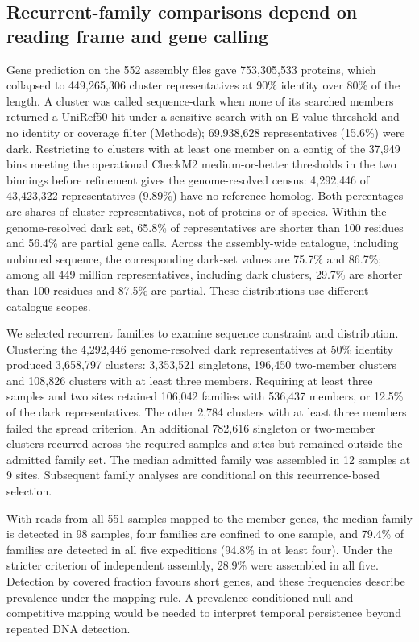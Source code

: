 \documentclass[11pt]{article}
\begin{document}
\subsection*{Recurrent-family comparisons depend on reading frame and gene calling}

Gene prediction on the 552 assembly files gave 753{,}305{,}533 proteins, which collapsed to
449{,}265{,}306 cluster representatives at 90\% identity over 80\% of the length. A cluster was
called sequence-dark when none of its searched members returned a UniRef50 hit under a sensitive
search with an E-value threshold and no identity or coverage filter (Methods); 69{,}938{,}628
representatives (15.6\%) were dark. Restricting to clusters with at least one member on a contig of
the 37{,}949 bins meeting the operational CheckM2 medium-or-better thresholds in the two binnings before refinement gives the
genome-resolved census: 4{,}292{,}446 of 43{,}423{,}322 representatives (9.89\%) have no reference
homolog. Both percentages are shares of cluster representatives, not of
proteins or of species. Within the genome-resolved dark set, 65.8\% of representatives are
shorter than 100 residues and 56.4\% are partial gene calls. Across the assembly-wide catalogue,
including unbinned sequence, the corresponding dark-set values are 75.7\% and 86.7\%; among all
449 million representatives, including dark clusters, 29.7\% are shorter than 100 residues and
87.5\% are partial. These distributions use different catalogue scopes.

We selected recurrent families to examine sequence constraint and distribution. Clustering the
4{,}292{,}446 genome-resolved dark representatives at 50\% identity produced 3{,}658{,}797 clusters:
3{,}353{,}521 singletons, 196{,}450 two-member clusters and 108{,}826 clusters with at least three
members. Requiring at least three samples and two sites retained 106{,}042 families with 536{,}437
members, or 12.5\% of the dark representatives. The other 2{,}784 clusters with at least three
members failed the spread criterion. An additional 782{,}616 singleton or two-member clusters
recurred across the required samples and sites but remained outside the admitted family set.
The median admitted family was assembled in 12 samples at 9 sites. Subsequent family analyses
are conditional on this recurrence-based selection.

With reads from all 551 samples mapped to the member genes, the median family is
detected in 98 samples, four families are confined to one sample, and 79.4\% of families are detected
in all five expeditions (94.8\% in at least four). Under the stricter criterion of independent
assembly, 28.9\% were assembled in all five. Detection by covered fraction
favours short genes, and these frequencies describe prevalence under the mapping rule. A prevalence-conditioned null and competitive mapping would be needed to interpret temporal persistence beyond repeated DNA detection.
\end{document}

